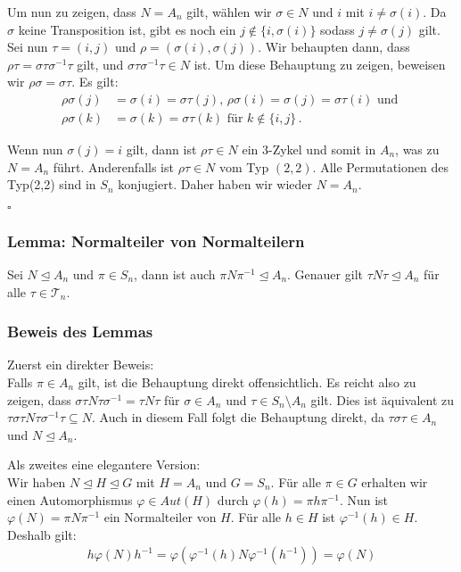 \documentclass[12pt, german]{article}
\newcommand{\bewiesen}{
	
	\begin{flushright}
		$\square$  \\
\end{flushright}}
\begin{document}
	Um nun zu zeigen, dass $N=A_n$ gilt, wählen wir $\sigma \in N$ und $i$ mit $i \not = \sigma(i)$. Da $\sigma$ keine Transposition ist, gibt es noch ein $j \notin \{i, \sigma(i)\}$ sodass $j \not=\sigma(j)$ gilt. \\
	
	Sei nun $\tau = (i, j)$ und $\rho = (\sigma(i), \sigma(j))$. 
	Wir behaupten dann, dass $\rho\tau = \sigma\tau\sigma^{-1}\tau$ gilt, und $\sigma\tau\sigma^{-1}\tau \in N$ ist. Um diese Behauptung zu zeigen, beweisen wir $\rho\sigma = \sigma\tau$. 
	Es gilt:
	\begin{align*}
		\rho\sigma(j) &= \sigma(i) = \sigma\tau(j) \text{, } \rho\sigma(i) = \sigma(j) = \sigma\tau(i) \text{ und }\\
		\rho\sigma(k) &= \sigma(k) = \sigma\tau(k) \text{ für } k \not \in \{i, j\}\, .
	\end{align*}
	
	Wenn nun $\sigma(j) = i$ gilt, dann ist $\rho\tau \in N$ ein $3$-Zykel und somit in $A_n$, was zu $N=A_n$ führt. 
	Anderenfalls ist $\rho\tau \in N$ vom Typ $(2,2)$. Alle Permutationen des Typ(2,2) sind in $S_n$ konjugiert. Daher haben wir wieder $N=A_n$.
	\bewiesen
	
	\subsubsection{Lemma: Normalteiler von Normalteilern}
	Sei $N \trianglelefteq A_n$ und $\pi \in S_n$, dann ist auch $\pi N\pi^{-1} \trianglelefteq A_n$. Genauer gilt $\tau N \tau \trianglelefteq A_n$ für alle $\tau \in \mathcal T_n$.
	\subsubsection{Beweis des Lemmas}
	Zuerst ein direkter Beweis: \\
	Falls $\pi \in A_n$ gilt, ist die Behauptung direkt offensichtlich. Es reicht also zu zeigen, dass $\sigma\tau N\tau\sigma^{-1} = \tau N \tau$ für $\sigma \in A_n$ und $\tau\in S_n \setminus A_n$ gilt. Dies ist äquivalent zu $ \tau \sigma \tau N \tau \sigma^{-1}\tau \subseteq N$. Auch in diesem Fall folgt die Behauptung direkt, da $\tau\sigma\tau \in A_n$ und $N\trianglelefteq A_n$. 
	\newline
	
	Als zweites eine elegantere Version: \\
	Wir haben $N \trianglelefteq H \trianglelefteq G$ mit $H = A_n$ und $G= S_n$. Für alle $\pi \in G$ erhalten wir einen Automorphismus $\varphi \in Aut(H)$ durch $\varphi(h) = \pi h\pi^{-1}$. Nun ist $\varphi(N) = \pi N\pi^{-1}$ ein Normalteiler von $H$. Für alle $h \in H$ ist $\varphi^{-1}(h) \in H$. 
	Deshalb gilt: 
	\begin{align*}
		h\varphi(N)h^{-1} = \varphi(\varphi^{-1}(h)N\varphi^{-1}(h^{-1})) = \varphi(N)
	\end{align*}
	
\end{document}
